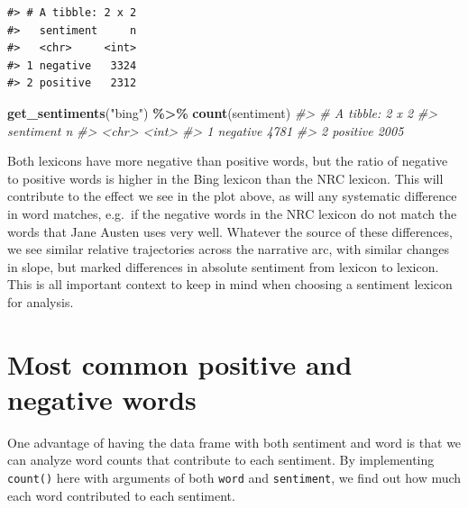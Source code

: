 \documentclass[
]{book}
\newenvironment{Shaded}{\begin{snugshade}}{\end{snugshade}}
\newcommand{\CommentTok}[1]{\textcolor[rgb]{0.56,0.35,0.01}{\textit{#1}}}
\newcommand{\FunctionTok}[1]{\textcolor[rgb]{0.13,0.29,0.53}{\textbf{#1}}}
\newcommand{\NormalTok}[1]{#1}
\newcommand{\SpecialCharTok}[1]{\textcolor[rgb]{0.81,0.36,0.00}{\textbf{#1}}}
\newcommand{\StringTok}[1]{\textcolor[rgb]{0.31,0.60,0.02}{#1}}
\begin{document}
\begin{verbatim}
#> # A tibble: 2 x 2
#>   sentiment     n
#>   <chr>     <int>
#> 1 negative   3324
#> 2 positive   2312
\end{verbatim}

\begin{Shaded}
\begin{Highlighting}[]
\FunctionTok{get\_sentiments}\NormalTok{(}\StringTok{"bing"}\NormalTok{) }\SpecialCharTok{\%\textgreater{}\%} 
  \FunctionTok{count}\NormalTok{(sentiment)}
\CommentTok{\#\textgreater{} \# A tibble: 2 x 2}
\CommentTok{\#\textgreater{}   sentiment     n}
\CommentTok{\#\textgreater{}   \textless{}chr\textgreater{}     \textless{}int\textgreater{}}
\CommentTok{\#\textgreater{} 1 negative   4781}
\CommentTok{\#\textgreater{} 2 positive   2005}
\end{Highlighting}
\end{Shaded}

Both lexicons have more negative than positive words, but the ratio of negative to positive words is higher in the Bing lexicon than the NRC lexicon. This will contribute to the effect we see in the plot above, as will any systematic difference in word matches, e.g.~if the negative words in the NRC lexicon do not match the words that Jane Austen uses very well. Whatever the source of these differences, we see similar relative trajectories across the narrative arc, with similar changes in slope, but marked differences in absolute sentiment from lexicon to lexicon. This is all important context to keep in mind when choosing a sentiment lexicon for analysis.

\section{Most common positive and negative words}\label{most-positive-negative}

One advantage of having the data frame with both sentiment and word is that we can analyze word counts that contribute to each sentiment. By implementing \texttt{count()} here with arguments of both \texttt{word} and \texttt{sentiment}, we find out how much each word contributed to each sentiment.
\end{document}
